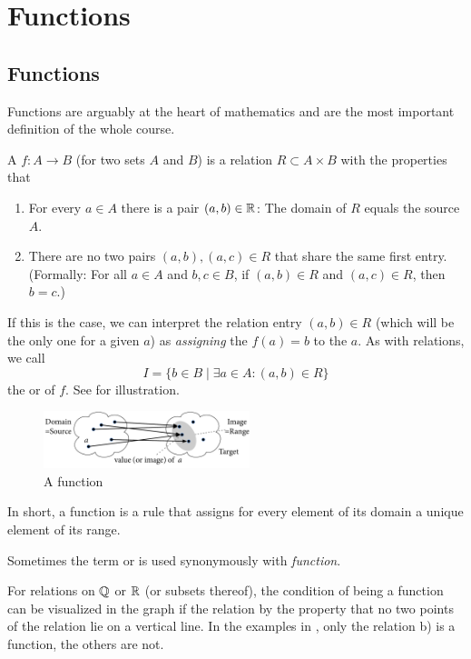 \chapter{Functions}
\label{chfuns}

\section{Functions}

Functions are arguably at the heart of mathematics and are the most
important definition of the whole course.

\begin{defn}
A  $f\colon A\to B$ (for two sets $A$ and $B$) is a relation $R\subset
A\times B$ with the properties that
\begin{enumerate}
\item 
For every $a\in A$ there is a pair $(a,b)\in{\mathbb R}$: The domain of $R$ equals the source $A$.
\item
There
are no two pairs $(a,b),(a,c)\in R$ that share the same first entry.
(Formally: 
For all $a\in A$ and $b,c\in B$, if $(a,b)\in R$ and
$(a,c)\in R$, then $b=c$.)
\end{enumerate}
If this is the case, we can interpret the relation entry $(a,b)\in R$ (which
will be the only one for a given $a$) as {\em assigning} the 
$f(a)=b$ to the  $a$. As with relations, we call 
\[
I=\{b\in B\mid \exists a\in A: (a,b)\in R\}
\]
the  or  of $f$.
See  for illustration.
\end{defn}

\begin{figure}[t]
\begin{center}
\includegraphics[width=6cm]{pic/GeneralFct.pdf}
\end{center}
\caption{A function}
\label{figgeneralfct}
\end{figure}

In short, a function is a rule that assigns for every element of its domain 
a unique element of its range.

Sometimes the term  or  is used synonymously
with {\em function}.

For relations on ${\mathbb Q}$ or ${\mathbb R}$ (or subsets thereof), the condition of being a
function can be
visualized in the graph if the relation by the property that no two points
of the relation lie on a vertical line. In the examples in
, only the relation b) is a function, the others
are not.
\smallskip

